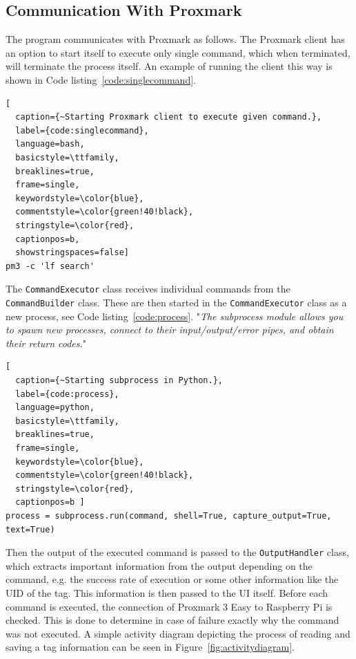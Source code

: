 \subsection{Communication With Proxmark}

The program communicates with Proxmark as follows. The Proxmark client has an option to start itself to execute only single command, which when terminated, will terminate the process itself. An example of running the client this way is shown in Code listing~\ref{code:singlecommand}.

\begin{lstlisting}[
  caption={~Starting Proxmark client to execute given command.},
  label={code:singlecommand},
  language=bash,
  basicstyle=\ttfamily,
  breaklines=true,
  frame=single, 
  keywordstyle=\color{blue},
  commentstyle=\color{green!40!black}, 
  stringstyle=\color{red},
  captionpos=b,
  showstringspaces=false]
pm3 -c 'lf search'
\end{lstlisting}

The \texttt{CommandExecutor} class receives individual commands from the \texttt{CommandBuilder} class. These are then started in the \texttt{CommandExecutor} class as a new process, see Code listing~\ref{code:process}. "\textit{The subprocess module allows you to spawn new processes, connect to their input/output/error pipes, and obtain their return codes.}"~\cite{pythonsubprocess}



\begin{lstlisting}[
  caption={~Starting subprocess in Python.},
  label={code:process},
  language=python,
  basicstyle=\ttfamily,
  breaklines=true,
  frame=single, 
  keywordstyle=\color{blue},
  commentstyle=\color{green!40!black}, 
  stringstyle=\color{red},
  captionpos=b ]
process = subprocess.run(command, shell=True, capture_output=True, text=True)
\end{lstlisting}

Then the output of the executed command is passed to the \texttt{OutputHandler} class, which extracts important information from the output depending on the command, e.g. the success rate of execution or some other information like the UID of the tag. This information is then passed to the UI itself. Before each command is executed, the connection of Proxmark 3 Easy to Raspberry Pi is checked. This is done to determine in case of failure exactly why the command was not executed. A simple activity diagram depicting the process of reading and saving a tag information can be seen in Figure~\ref{fig:activitydiagram}.

